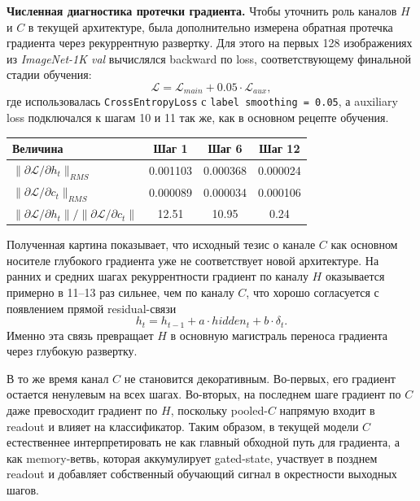 \documentclass[11pt,landscape]{article}
\begin{document}
\vspace{4mm}

\noindent\textbf{Численная диагностика протечки градиента.}
Чтобы уточнить роль каналов $H$ и $C$ в текущей архитектуре, была дополнительно измерена обратная протечка градиента через рекуррентную развертку. Для этого на первых 128 изображениях из \textit{ImageNet-1K val} вычислялся backward по loss, соответствующему финальной стадии обучения:
\[
\mathcal{L} = \mathcal{L}_{main} + 0.05 \cdot \mathcal{L}_{aux},
\]
где использовалась \texttt{CrossEntropyLoss} с \texttt{label smoothing = 0.05}, а auxiliary loss подключался к шагам 10 и 11 так же, как в основном рецепте обучения.

\medskip

\begin{center}
\small
\begin{tabular}{|l|c|c|c|}
\hline
\textbf{Величина} & \textbf{Шаг 1} & \textbf{Шаг 6} & \textbf{Шаг 12} \\
\hline
$\|\partial \mathcal{L} / \partial h_t\|_{RMS}$ & 0.001103 & 0.000368 & 0.000024 \\
\hline
$\|\partial \mathcal{L} / \partial c_t\|_{RMS}$ & 0.000089 & 0.000034 & 0.000106 \\
\hline
$\|\partial \mathcal{L} / \partial h_t\| / \|\partial \mathcal{L} / \partial c_t\|$ & 12.51 & 10.95 & 0.24 \\
\hline
\end{tabular}
\normalsize
\end{center}

\medskip

\noindent
Полученная картина показывает, что исходный тезис о канале $C$ как основном носителе глубокого градиента уже не соответствует новой архитектуре. На ранних и средних шагах рекуррентности градиент по каналу $H$ оказывается примерно в 11--13 раз сильнее, чем по каналу $C$, что хорошо согласуется с появлением прямой residual-связи
\[
h_t = h_{t-1} + a \cdot hidden_t + b \cdot \delta_t.
\]
Именно эта связь превращает $H$ в основную магистраль переноса градиента через глубокую развертку.

\medskip

\noindent
В то же время канал $C$ не становится декоративным. Во-первых, его градиент остается ненулевым на всех шагах. Во-вторых, на последнем шаге градиент по $C$ даже превосходит градиент по $H$, поскольку pooled-$C$ напрямую входит в readout и влияет на классификатор. Таким образом, в текущей модели $C$ естественнее интерпретировать не как главный обходной путь для градиента, а как memory-ветвь, которая аккумулирует gated-state, участвует в позднем readout и добавляет собственный обучающий сигнал в окрестности выходных шагов.
\end{document}
